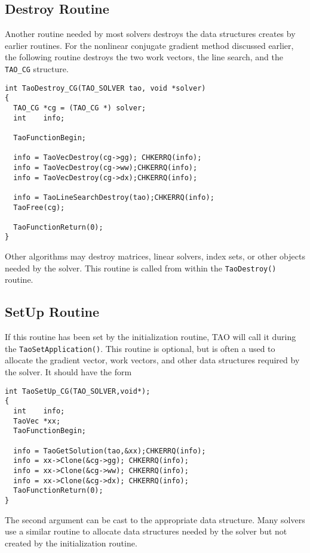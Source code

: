 \subsection{Destroy Routine}
Another routine needed by most solvers destroys the data structures
creates by earlier routines.  For the nonlinear conjugate gradient
method discussed earlier, the following routine destroys the two
work vectors, the line search, and the {\tt TAO\_CG} structure. 
\begin{verbatim}
int TaoDestroy_CG(TAO_SOLVER tao, void *solver)
{
  TAO_CG *cg = (TAO_CG *) solver;
  int    info;

  TaoFunctionBegin;

  info = TaoVecDestroy(cg->gg); CHKERRQ(info);
  info = TaoVecDestroy(cg->ww);CHKERRQ(info);
  info = TaoVecDestroy(cg->dx);CHKERRQ(info);

  info = TaoLineSearchDestroy(tao);CHKERRQ(info);
  TaoFree(cg);

  TaoFunctionReturn(0);
}
\end{verbatim}
Other algorithms may destroy matrices, linear solvers, index sets, or
other objects needed by the solver.  This routine is called from within
the {\tt TaoDestroy()} routine.


\subsection{SetUp Routine}
If this routine has been set by the initialization routine, TAO
will call it during the {\tt TaoSetApplication()}.  
This routine is optional, but is often a used to allocate
the gradient vector, work vectors, and other data structures 
required by the solver.
It should have the form
\begin{verbatim}
int TaoSetUp_CG(TAO_SOLVER,void*);
{
  int    info;
  TaoVec *xx;
  TaoFunctionBegin;

  info = TaoGetSolution(tao,&xx);CHKERRQ(info);
  info = xx->Clone(&cg->gg); CHKERRQ(info);
  info = xx->Clone(&cg->ww); CHKERRQ(info);
  info = xx->Clone(&cg->dx); CHKERRQ(info);
  TaoFunctionReturn(0);
}
\end{verbatim}
The second argument can be cast to the appropriate data structure.
Many solvers use a similar routine to allocate data structures
needed by the solver but not created by the initialization routine.


